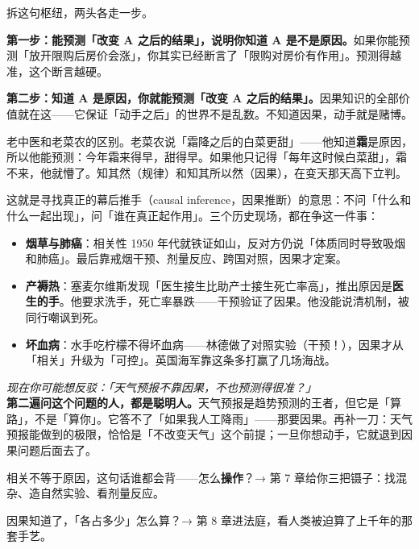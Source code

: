 \documentclass[../../main2.tex]{subfiles}
\begin{document}
拆这句枢纽，两头各走一步。

\textbf{第一步：能预测「改变 A 之后的结果」，说明你知道 A 是不是原因。}如果你能预测「放开限购后房价会涨」，你其实已经断言了「限购对房价有作用」。预测得越准，这个断言越硬。

\textbf{第二步：知道 A 是原因，你就能预测「改变 A 之后的结果」。}因果知识的全部价值就在这——它保证「动手之后」的世界不是乱数。不知道因果，动手就是赌博。

\begin{tcolorbox}[colback=green!5, title=\textit{生活类比}]
	老中医和老菜农的区别。老菜农说「霜降之后的白菜更甜」——他知道\textbf{霜}是原因，所以他能预测：今年霜来得早，甜得早。如果他只记得「每年这时候白菜甜」，霜不来，他就懵了。知其然（规律）和知其所以然（因果），在变天那天高下立判。
\end{tcolorbox}

这就是寻找真正的幕后推手（causal inference，因果推断）的意思：不问「什么和什么一起出现」，问「谁在真正起作用」。三个历史现场，都在争这一件事：

\begin{itemize}
	\item \textbf{烟草与肺癌}：相关性 1950 年代就铁证如山，反对方仍说「体质同时导致吸烟和肺癌」。最后靠戒烟干预、剂量反应、跨国对照，因果才定案。
	\item \textbf{产褥热}：塞麦尔维斯发现「医生接生比助产士接生死亡率高」，推出原因是\textbf{医生的手}。他要求洗手，死亡率暴跌——干预验证了因果。他没能说清机制，被同行嘲讽到死。
	\item \textbf{坏血病}：水手吃柠檬不得坏血病——林德做了对照实验（干预！），因果才从「相关」升级为「可控」。英国海军靠这条多打赢了几场海战。
\end{itemize}


\begin{questionbox}
	\textit{现在你可能想反驳：「天气预报不靠因果，不也预测得很准？」}\\
	\textbf{第二遍问这个问题的人，都是聪明人。}天气预报是趋势预测的王者，但它是「算路」，不是「算你」。它答不了「如果我人工降雨」——那要因果。再补一刀：天气预报能做到的极限，恰恰是「不改变天气」这个前提；一旦你想动手，它就退到因果问题后面去了。
\end{questionbox}

\begin{reader_anticipation}
	\item 相关不等于原因，这句话谁都会背——怎么\textbf{操作}？→ 第 7 章给你三把镊子：找混杂、造自然实验、看剂量反应。
	\item 因果知道了，「各占多少」怎么算？→ 第 8 章进法庭，看人类被迫算了上千年的那套手艺。
\end{reader_anticipation}
\end{document}
